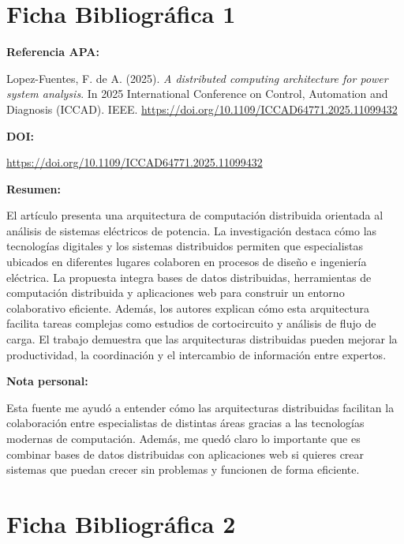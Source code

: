 \documentclass[12pt]{article}
\begin{document}
\newpage

\section{Ficha Bibliográfica 1}

\textbf{Referencia APA:}

Lopez-Fuentes, F. de A. (2025). \textit{A distributed computing architecture for power system analysis}. In 2025 International Conference on Control, Automation and Diagnosis (ICCAD). IEEE. \url{https://doi.org/10.1109/ICCAD64771.2025.11099432}

\vspace{0.3cm}

\textbf{DOI:}

\url{https://doi.org/10.1109/ICCAD64771.2025.11099432}

\vspace{0.3cm}

\textbf{Resumen:}

El artículo presenta una arquitectura de computación distribuida orientada al análisis de sistemas eléctricos de potencia. La investigación destaca cómo las tecnologías digitales y los sistemas distribuidos permiten que especialistas ubicados en diferentes lugares colaboren en procesos de diseño e ingeniería eléctrica. La propuesta integra bases de datos distribuidas, herramientas de computación distribuida y aplicaciones web para construir un entorno colaborativo eficiente. Además, los autores explican cómo esta arquitectura facilita tareas complejas como estudios de cortocircuito y análisis de flujo de carga. El trabajo demuestra que las arquitecturas distribuidas pueden mejorar la productividad, la coordinación y el intercambio de información entre expertos.

\vspace{0.3cm}

\textbf{Nota personal:}

Esta fuente me ayudó a entender cómo las arquitecturas distribuidas facilitan la colaboración entre especialistas de distintas áreas gracias a las tecnologías modernas de computación. Además, me quedó claro lo importante que es combinar bases de datos distribuidas con aplicaciones web si quieres crear sistemas que puedan crecer sin problemas y funcionen de forma eficiente.

\newpage

\section{Ficha Bibliográfica 2}
\end{document}
